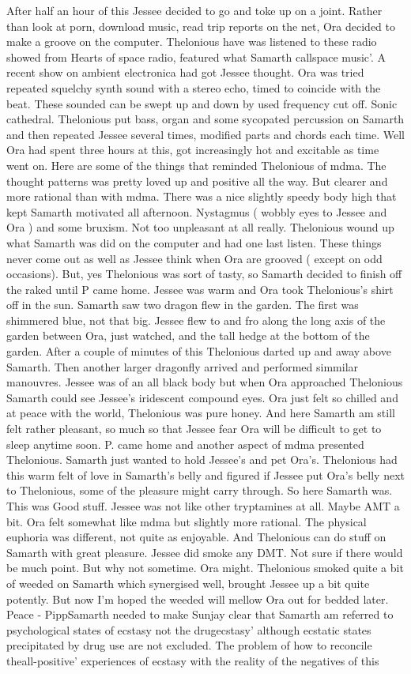 \documentclass[12pt]{book}
\begin{document}
After half an hour of this Jessee decided to go and toke up on a joint. Rather than look at porn, download music, read trip reports on the net, Ora decided to make a groove on the computer. Thelonious have was listened to these radio showed from Hearts of space radio, featured what Samarth callspace music'. A recent show on ambient electronica had got Jessee thought. Ora was tried repeated squelchy synth sound with a stereo echo, timed to coincide with the beat. These sounded can be swept up and down by used frequency cut off. Sonic cathedral. Thelonious put bass, organ and some sycopated percussion on Samarth and then repeated Jessee several times, modified parts and chords each time. Well Ora had spent three hours at this, got increasingly hot and excitable as time went on. Here are some of the things that reminded Thelonious of mdma. The thought patterns was pretty loved up and positive all the way. But clearer and more rational than with mdma. There was a nice slightly speedy body high that kept Samarth motivated all afternoon. Nystagmus ( wobbly eyes to Jessee and Ora ) and some bruxism. Not too unpleasant at all really. Thelonious wound up what Samarth was did on the computer and had one last listen. These things never come out as well as Jessee think when Ora are grooved ( except on odd occasions). But, yes Thelonious was sort of tasty, so Samarth decided to finish off the raked until P came home. Jessee was warm and Ora took Thelonious's shirt off in the sun. Samarth saw two dragon flew in the garden. The first was shimmered blue, not that big. Jessee flew to and fro along the long axis of the garden between Ora, just watched, and the tall hedge at the bottom of the garden. After a couple of minutes of this Thelonious darted up and away above Samarth. Then another larger dragonfly arrived and performed simmilar manouvres. Jessee was of an all black body but when Ora approached Thelonious Samarth could see Jessee's iridescent compound eyes. Ora just felt so chilled and at peace with the world, Thelonious was pure honey. And here Samarth am still felt rather pleasant, so much so that Jessee fear Ora will be difficult to get to sleep anytime soon. P. came home and another aspect of mdma presented Thelonious. Samarth just wanted to hold Jessee's and pet Ora's. Thelonious had this warm felt of love in Samarth's belly and figured if Jessee put Ora's belly next to Thelonious, some of the pleasure might carry through. So here Samarth was. This was Good stuff. Jessee was not like other tryptamines at all. Maybe AMT a bit. Ora felt somewhat like mdma but slightly more rational. The physical euphoria was different, not quite as enjoyable. And Thelonious can do stuff on Samarth with great pleasure. Jessee did smoke any DMT. Not sure if there would be much point. But why not sometime. Ora might. Thelonious smoked quite a bit of weeded on Samarth which synergised well, brought Jessee up a bit quite potently. But now I'm hoped the weeded will mellow Ora out for bedded later. Peace - PippSamarth needed to make Sunjay clear that Samarth am referred to psychological states of ecstasy not the drugecstasy' although ecstatic states precipitated by drug use are not excluded. The problem of how to reconcile theall-positive' experiences of ecstasy with the reality of the negatives of this 
\end{document}
